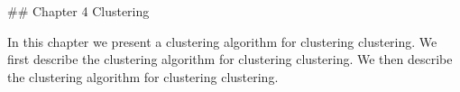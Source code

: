 

## Chapter 4 Clustering

In this chapter we present a clustering algorithm for clustering clustering. We first describe the clustering algorithm for clustering clustering. We then describe the clustering algorithm for clustering clustering.

